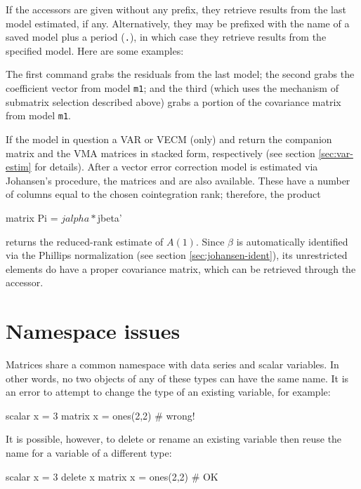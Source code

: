 If the accessors are given without any prefix, they retrieve results
from the last model estimated, if any.  Alternatively, they may be
prefixed with the name of a saved model plus a period (\texttt{.}), in
which case they retrieve results from the specified model.  Here are
some examples:
%
The first command grabs the residuals from the last model; the second
grabs the coefficient vector from model \texttt{m1}; and the third
(which uses the mechanism of submatrix selection described above)
grabs a portion of the covariance matrix from model \texttt{m1}.

If the model in question a VAR or VECM (only)  and
 return the companion matrix and the VMA matrices in
stacked form, respectively (see section \ref{sec:var-estim} for
details).  After a vector error correction model is estimated via
Johansen's procedure, the matrices  and 
are also available. These have a number of columns equal to the chosen
cointegration rank; therefore, the product
\begin{code}
matrix Pi = $jalpha * $jbeta'
\end{code}
returns the reduced-rank estimate of $A(1)$. Since $\beta$ is
automatically identified via the Phillips normalization (see section
\ref{sec:johansen-ident}), its unrestricted elements do have a proper
covariance matrix, which can be retrieved through the
 accessor.

\section{Namespace issues}
\label{matrix-namespace}

Matrices share a common namespace with data series and scalar
variables.  In other words, no two objects of any of these types can
have the same name.  It is an error to attempt to change the type of
an existing variable, for example:
%
\begin{code}
scalar x = 3
matrix x = ones(2,2) # wrong!
\end{code}
%
It is possible, however, to delete or rename an existing variable then
reuse the name for a variable of a different type:
\begin{code}
scalar x = 3
delete x
matrix x = ones(2,2) # OK
\end{code}


